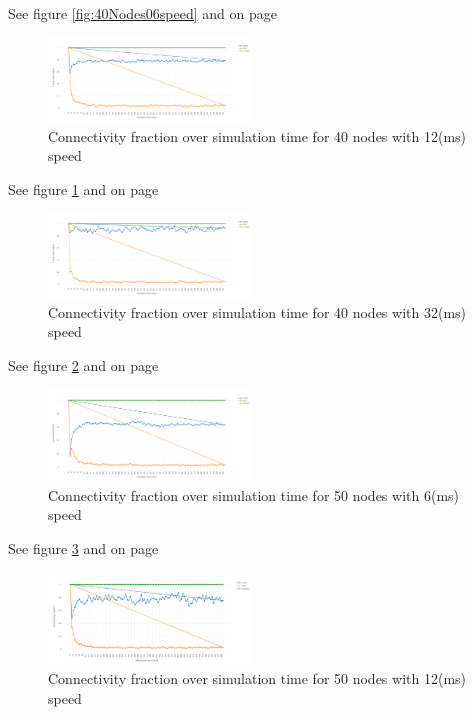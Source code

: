 \documentclass[letterpaper, 10 pt, conference]{ieeeconf}  %
\begin{document}
See figure \ref{fig:40Nodes06speed} and on page \pageref{fig:40Nodes06speed}


\begin{figure}[H]
\includegraphics[width=0.48\textwidth]{40Nodes12speed}
\caption{Connectivity fraction over simulation time for 40 nodes with 12(ms) speed}
\label{fig:40Nodes12speed}
\end{figure}

See figure \ref{fig:40Nodes12speed} and on page \pageref{fig:40Nodes12speed}


\begin{figure}[H]
\includegraphics[width=0.48\textwidth]{40Nodes32speed}
\caption{Connectivity fraction over simulation time for 40 nodes with 32(ms) speed}
\label{fig:40Nodes32speed}
\end{figure}

See figure \ref{fig:40Nodes32speed} and on page \pageref{fig:40Nodes32speed}


\begin{figure}[H]
\includegraphics[width=0.48\textwidth]{50Nodes06speed}
\caption{Connectivity fraction over simulation time for 50 nodes with 6(ms) speed}
\label{fig:50Nodes06speed}
\end{figure}

See figure \ref{fig:50Nodes06speed} and on page \pageref{fig:50Nodes06speed}



\begin{figure}[H]
\includegraphics[width=0.48\textwidth]{50Nodes12speed}
\caption{Connectivity fraction over simulation time for 50 nodes with 12(ms) speed}
\label{fig:50Nodes12speed}
\end{figure}
\end{document}
